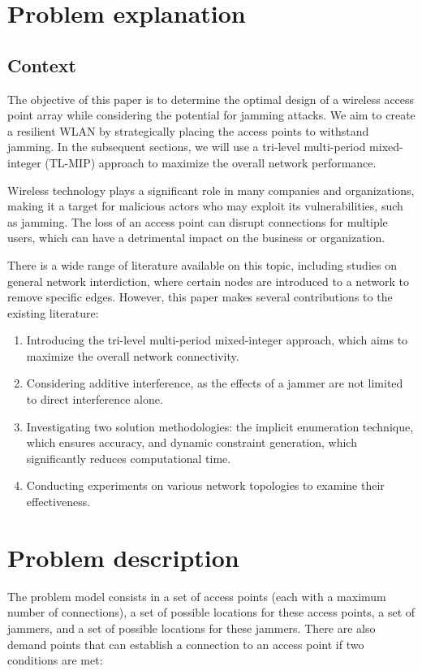 \documentclass[runningheads]{llncs}
\begin{document}
\section{Problem explanation}
\subsection{Context}

 The objective of this paper is to determine the optimal design of a wireless access point array while considering the potential for jamming attacks. We aim to create a resilient WLAN by strategically placing the access points to withstand jamming. In the subsequent sections, we will use a tri-level multi-period mixed-integer (TL-MIP) approach to maximize the overall network performance.
 
Wireless technology plays a significant role in many companies and organizations, making it a target for malicious actors who may exploit its vulnerabilities, such as jamming. The loss of an access point can disrupt connections for multiple users, which can have a detrimental impact on the business or organization.

There is a wide range of literature available on this topic, including studies on general network interdiction, where certain nodes are introduced to a network to remove specific edges. However, this paper makes several contributions to the existing literature:
\begin{enumerate}
    \item Introducing the tri-level multi-period mixed-integer approach, which aims to maximize the overall network connectivity.
    \item Considering additive interference, as the effects of a jammer are not limited to direct interference alone.
    \item Investigating two solution methodologies: the implicit enumeration technique, which ensures accuracy, and dynamic constraint generation, which significantly reduces computational time.
    \item Conducting experiments on various network topologies to examine their effectiveness.
\end{enumerate}

\section{Problem description}

The problem model consists in a set of access points (each with a maximum number of connections), a set of possible locations for these access points, a set of jammers, and a set of possible locations for these jammers.
There are also demand points that can establish a connection to an access point if two conditions are met:
\end{document}
